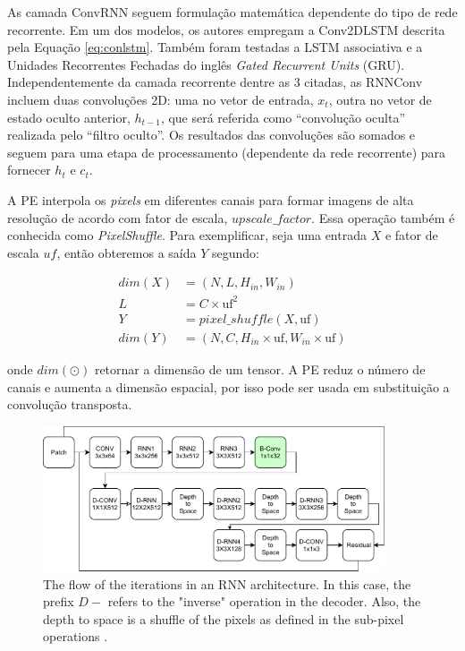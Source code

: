 As camada ConvRNN seguem formulação matemática dependente do tipo de rede recorrente. 
Em um dos modelos, os autores empregam a Conv2DLSTM descrita pela Equação \ref{eq:conlstm}. Também foram testadas a LSTM associativa e a Unidades Recorrentes Fechadas do inglês \textit{Gated Recurrent Units} (GRU).
Independentemente da camada recorrente dentre as 3 citadas, as RNNConv
incluem duas convoluções 2D: uma no vetor de entrada, $x_t$, outra no vetor de estado oculto anterior, $h_{t-1}$, que será referida como ``convolução oculta'' realizada pelo  ``filtro oculto''. Os resultados das convoluções são somados e seguem para uma etapa de processamento (dependente da rede recorrente) para fornecer $h_t$ e $c_t$.

A PE interpola os \textit{pixels} em diferentes canais para formar imagens de alta resolução de acordo com fator de escala, $upscale\_factor$. Essa operação também é conhecida como \textit{PixelShuffle}. Para exemplificar, seja uma entrada $X$ e fator de escala $uf$, então obteremos a saída $Y$ segundo:   

\begin{equation}
\label{eq:pf}
\begin{aligned}
dim(X) &= (N,L,H_{in}, W_{in}) \\
L &=  C \times \text{uf}^2 \\ 
Y &= pixel\_shuffle(X, \text{uf}) \\
dim(Y) &= (N,C,H_{in} \times \text{uf}, W_{in}\times \text{uf}) 
\end{aligned}
\end{equation} 

onde $dim \left( \odot \right)$ retornar a dimensão de um tensor. A PE reduz o número de canais e aumenta a dimensão espacial, por isso pode ser usada em substituição a convolução transposta.  

\begin{figure}[h]
	\centering
	\includegraphics[width=0.90\textwidth]{figuras/toderici_3.pdf}
	\caption{The flow of the iterations in an RNN architecture. In this case, the prefix $D-$ refers to the "inverse" operation in the decoder.   Also, the depth to space is a shuffle of the pixels as defined in the sub-pixel operations \cite{FullResolution2017Toderici}.}
	\label{fig:toderici3}
\end{figure}

